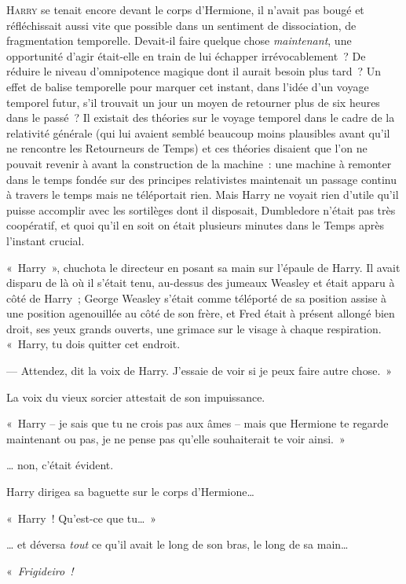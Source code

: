 
\lettrine{H}{arry} se tenait encore devant le corps d'Hermione, il n'avait pas bougé et réfléchissait aussi vite que possible dans un sentiment de dissociation, de fragmentation temporelle. Devait-il faire quelque chose \emph{maintenant}, une opportunité d'agir était-elle en train de lui échapper irrévocablement~? De réduire le niveau d'omnipotence magique dont il aurait besoin plus tard~? Un effet de balise temporelle pour marquer cet instant, dans l'idée d'un voyage temporel futur, s'il trouvait un jour un moyen de retourner plus de six heures dans le passé~? Il existait des théories sur le voyage temporel dans le cadre de la relativité générale (qui lui avaient semblé beaucoup moins plausibles avant qu'il ne rencontre les Retourneurs de Temps) et ces théories disaient que l'on ne pouvait revenir à avant la construction de la machine~: une machine à remonter dans le temps fondée sur des principes relativistes maintenait un passage continu à travers le temps mais ne téléportait rien. Mais Harry ne voyait rien d'utile qu'il puisse accomplir avec les sortilèges dont il disposait, Dumbledore n'était pas très coopératif, et quoi qu'il en soit on était plusieurs minutes dans le Temps après l'instant crucial.

«~Harry~», chuchota le directeur en posant sa main sur l'épaule de Harry. Il avait disparu de là où il s'était tenu, au-dessus des jumeaux Weasley et était apparu à côté de Harry~; George Weasley s'était comme téléporté de sa position assise à une position agenouillée au côté de son frère, et Fred était à présent allongé bien droit, ses yeux grands ouverts, une grimace sur le visage à chaque respiration. «~Harry, tu dois quitter cet endroit.

--- Attendez, dit la voix de Harry. J'essaie de voir si je peux faire autre chose.~»

La voix du vieux sorcier attestait de son impuissance.

«~Harry -- je sais que tu ne crois pas aux âmes -- mais que Hermione te regarde maintenant ou pas, je ne pense pas qu'elle souhaiterait te voir ainsi.~»

… non, c'était évident.

Harry dirigea sa baguette sur le corps d'Hermione…

«~Harry~! Qu'est-ce que tu…~»

… et déversa \emph{tout} ce qu'il avait le long de son bras, le long de sa main…

«~\emph{Frigideiro~!}

